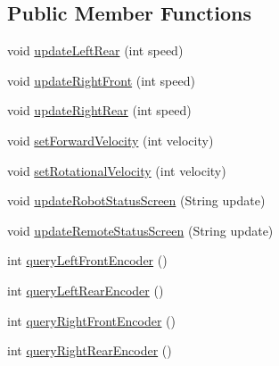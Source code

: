 \subsection*{Public Member Functions}
\begin{DoxyCompactItemize}
\item 
void \hyperlink{interfacerob_o_s2_1_1hardware_1_1interfaces_1_1listeners_1_1_i_four_motor_interface_af838619ebdee4ba9043d0c4daef6268e}{updateLeftRear} (int speed)
\item 
void \hyperlink{interfacerob_o_s2_1_1hardware_1_1interfaces_1_1listeners_1_1_i_four_motor_interface_a4dc323e62063fd24eb210771d082c46b}{updateRightFront} (int speed)
\item 
void \hyperlink{interfacerob_o_s2_1_1hardware_1_1interfaces_1_1listeners_1_1_i_four_motor_interface_a780ba70dc7968836e1184af63ff541c3}{updateRightRear} (int speed)
\item 
void \hyperlink{interfacerob_o_s2_1_1hardware_1_1interfaces_1_1listeners_1_1_i_four_motor_interface_ab7a4b66f6f136eeac77512efe967d548}{setForwardVelocity} (int velocity)
\item 
void \hyperlink{interfacerob_o_s2_1_1hardware_1_1interfaces_1_1listeners_1_1_i_four_motor_interface_a30ae749f610cf916f29a6f803e0b5dc8}{setRotationalVelocity} (int velocity)
\item 
void \hyperlink{interfacerob_o_s2_1_1hardware_1_1interfaces_1_1listeners_1_1_i_four_motor_interface_a1ca67978782c1b0dad0ca77df2a7a699}{updateRobotStatusScreen} (String update)
\item 
void \hyperlink{interfacerob_o_s2_1_1hardware_1_1interfaces_1_1listeners_1_1_i_four_motor_interface_aacfac6e16c31709ca3facd068b6cf0b5}{updateRemoteStatusScreen} (String update)
\item 
int \hyperlink{interfacerob_o_s2_1_1hardware_1_1interfaces_1_1listeners_1_1_i_four_motor_interface_a19ac90a7caad0954584123eee6fb0e89}{queryLeftFrontEncoder} ()
\item 
int \hyperlink{interfacerob_o_s2_1_1hardware_1_1interfaces_1_1listeners_1_1_i_four_motor_interface_a0d16bb0c12845da37be096fef5bef3ae}{queryLeftRearEncoder} ()
\item 
int \hyperlink{interfacerob_o_s2_1_1hardware_1_1interfaces_1_1listeners_1_1_i_four_motor_interface_af7584c99b5aabb9c4aaa1db6dc50c027}{queryRightFrontEncoder} ()
\item 
int \hyperlink{interfacerob_o_s2_1_1hardware_1_1interfaces_1_1listeners_1_1_i_four_motor_interface_a95c31cbad1aa2f5c9b3d3e4ac413e013}{queryRightRearEncoder} ()
\end{DoxyCompactItemize}
